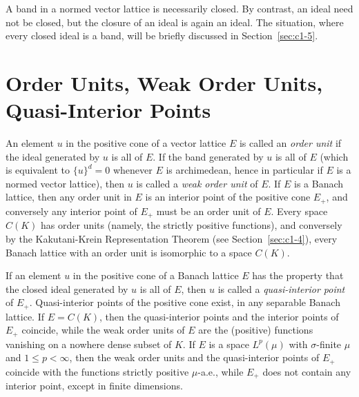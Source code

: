 A band in a normed vector lattice is necessarily closed.
By contrast, an ideal need not be closed, but the closure of an ideal is again an ideal.
The situation, where every closed ideal is a band, will be briefly discussed in Section~\ref{sec:c1-5}.
\section{Order Units, Weak Order Units, Quasi-Interior Points}\label{sec:c1-2}%
%
%

An element $ u $ in the positive cone of a vector lattice $ E $ is called an \emph{order unit} if the ideal generated by $ u $ is all of\/ $ E $.
If the band generated by $ u $ is all of\/ $ E $ (which is equivalent to $ \{u\}^{d} = 0 $ whenever $ E $ is archimedean, hence in particular if\/ $ E $ is a normed vector lattice), then $ u $ is called a \emph{weak order unit} of\/ $ E $.
If\/ $ E $ is a Banach lattice, then any order unit in $ E $ is an interior point of the positive cone $ E_{+} $, and conversely any interior point of\/ $ E_{+} $ must be an order unit of\/ $ E $.
Every space $ C(K) $ has order units (namely, the strictly positive functions), and conversely by the Kakutani-Krein Representation Theorem (see Section~\ref{sec:c1-4}), every Banach lattice with an order unit is isomorphic to a space $ C(K) $.

If an element $ u $ in the positive cone of a Banach lattice $ E $ has the property that the closed ideal generated by $ u $ is all of\/ $ E $, then $ u $ is called a \emph{quasi-interior point} of\/ $ E_{+} $.
Quasi-interior points of the positive cone exist, \eg in any separable Banach lattice.
If\/ $ E = C(K) $, then the quasi-interior points and the interior points of\/ $ E_{+} $ coincide, while the weak order units of\/ $ E $ are the (positive) functions vanishing on a nowhere dense subset of\/ $ K $.
If\/ $ E $ is a space $ L^{p}(\mu) $ with $ \sigma $-finite $ \mu $ and $ 1 \leq p < \infty $, then the weak order units and the quasi-interior points of\/ $ E_{+} $ coincide with the functions strictly positive $ \mu $-a.e., while $ E_{+} $ does not contain any interior point, except in finite dimensions.
